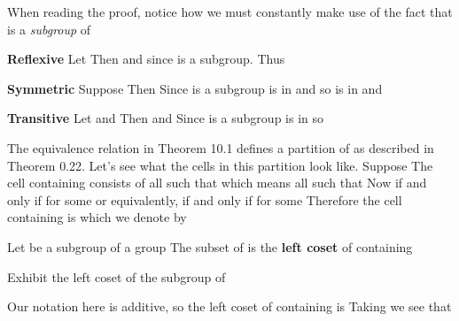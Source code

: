 \documentclass[11pt,oneside]{article}
\begin{document}
\BookNarrativetrue

\begin{BookBody}

 When reading the proof, notice how we must constantly make use of the fact that  is a \textit{subgroup} of 

\textbf{Reflexive} Let  Then  and  since  is a subgroup. Thus 

\textbf{Symmetric} Suppose  Then  Since  is a subgroup is in  and  so  is in  and 

\textbf{Transitive} Let  and  Then  and  Since  is a subgroup is in  so \BookEnd{\blacklozenge}

The equivalence relation  in Theorem 10.1 defines a partition of  as described in Theorem 0.22. Let’s see what the cells in this partition look like. Suppose  The cell containing  consists of all  such that  which means all  such that  Now  if and only if  for some  or equivalently, if and only if  for some  Therefore the cell containing  is  which we denote by 

 Let  be a subgroup of a group  The subset  of  is the\textbf{ left coset} of  containing \BookEnd{\blacksquare}

 Exhibit the left coset of the subgroup  of 

 Our notation here is additive, so the left coset of  containing  is  Taking  we see that


\end{BookBody}
\end{document}
